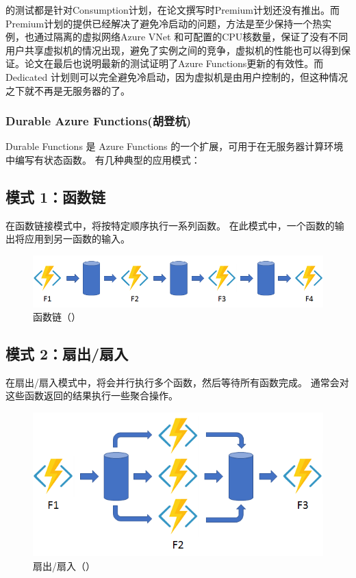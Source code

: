 \documentclass[11pt]{article}
\begin{document}
\cite{wang2018peeking}的测试都是针对Consumption计划，在论文撰写时Premium计划还没有推出。而Premium计划的提供已经解决了避免冷启动的问题，方法是至少保持一个热实例，也通过隔离的虚拟网络Azure VNet 和可配置的CPU核数量，保证了没有不同用户共享虚拟机的情况出现，避免了实例之间的竞争，虚拟机的性能也可以得到保证。论文在最后也说明最新的测试证明了Azure Functions更新的有效性。而Dedicated 计划则可以完全避免冷启动，因为虚拟机是由用户控制的，但这种情况之下就不再是无服务器的了。
\subsubsection{Durable Azure Functions(胡登杭)}
Durable Functions 是 Azure Functions 的一个扩展，可用于在无服务器计算环境中编写有状态函数。  
有几种典型的应用模式：
\subsection{模式 1：函数链}
在函数链接模式中，将按特定顺序执行一系列函数。 在此模式中，一个函数的输出将应用到另一函数的输入。
\begin{figure}[H]
\begin{flushleft}
\includegraphics[width=\textwidth]{figs/model1}
\caption{函数链（\cite{Durable}）}
\end{flushleft}
\end{figure}

\subsection{模式 2：扇出/扇入}
在扇出/扇入模式中，将会并行执行多个函数，然后等待所有函数完成。 通常会对这些函数返回的结果执行一些聚合操作。
\begin{figure}[H]
\begin{flushleft}
\includegraphics[width=\textwidth]{figs/model2}
\caption{扇出/扇入（\cite{Durable}）}
\end{flushleft}
\end{figure}
\end{document}
